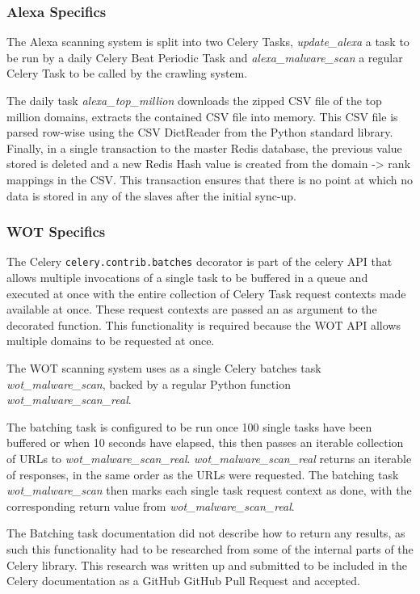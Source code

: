\subsubsection{Alexa Specifics}
The Alexa scanning system is split into two Celery Tasks, \emph{update\_alexa} a task to be run by a daily Celery Beat Periodic Task and \emph{alexa\_malware\_scan} a regular Celery Task to be called by the crawling system.

The daily task \emph{alexa\_top\_million} downloads the zipped CSV file of the top million domains, extracts the contained CSV file into memory. This CSV file is parsed row-wise using the CSV DictReader from the Python standard library. Finally, in a single transaction to the master Redis database, the previous value stored is deleted and a new Redis Hash value is created from the domain -> rank mappings in the CSV. This transaction ensures that there is no point at which no data is stored in any of the slaves after the initial sync-up.

\subsubsection{WOT Specifics}
The Celery \verb`celery.contrib.batches` decorator is part of the celery API that allows multiple invocations of a single task to be buffered in a queue and executed at once with the entire collection of Celery Task request contexts made available at once. These request contexts are passed an as argument to the decorated function. This functionality is required because the WOT API allows multiple domains to be requested at once.

The WOT scanning system uses as a single Celery batches task \emph{wot\_malware\_scan}, backed by a regular Python function \emph{wot\_malware\_scan\_real}.

The batching task is configured to be run once 100 single tasks have been buffered or when 10 seconds have elapsed, this then passes an iterable collection of URLs to \emph{wot\_malware\_scan\_real}. \emph{wot\_malware\_scan\_real} returns an iterable of responses, in the same order as the URLs were requested. The batching task \emph{wot\_malware\_scan} then marks each single task request context as done, with the corresponding return value from \emph{wot\_malware\_scan\_real}\cite{celery-batches}.

The Batching task documentation did not describe how to return any results, as such this functionality had to be researched from some of the internal parts of the Celery library.  This research was written up and submitted to be included in the Celery documentation as a GitHub GitHub Pull Request and accepted\cite{celery-batches-fix}.

